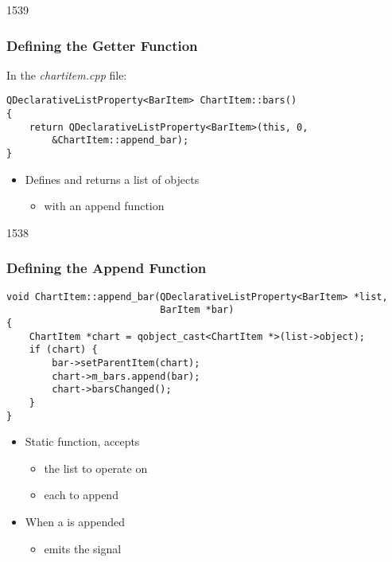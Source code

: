 \begin{slide}[fragile]{1539}\frametitle{Defining the Getter Function}

In the \textit{chartitem.cpp} file:

\vspace*{0.5em}
\begin{lstlisting}
QDeclarativeListProperty<BarItem> ChartItem::bars()
{
    return QDeclarativeListProperty<BarItem>(this, 0,
        &ChartItem::append_bar);
}
\end{lstlisting}

\vspace*{0.5em}
\begin{itemize}
\item Defines and returns a list of  objects
  \begin{itemize}
  \item with an append function
  \end{itemize}
\end{itemize}

\end{slide}

\begin{slide}[fragile]{1538}\frametitle{Defining the Append Function}

\begin{lstlisting}
void ChartItem::append_bar(QDeclarativeListProperty<BarItem> *list,
                           BarItem *bar)
{
    ChartItem *chart = qobject_cast<ChartItem *>(list->object);
    if (chart) {
        bar->setParentItem(chart);
        chart->m_bars.append(bar);
        chart->barsChanged();
    }
}
\end{lstlisting}

\vspace*{0.5em}
\begin{itemize}
\item Static function, accepts
  \begin{itemize}
  \item the list to operate on
  \item each  to append
  \end{itemize}
\vspace*{0.5em}
\item When a  is appended
  \begin{itemize}
  \item emits the  signal
  \end{itemize}
\end{itemize}

\end{slide}

